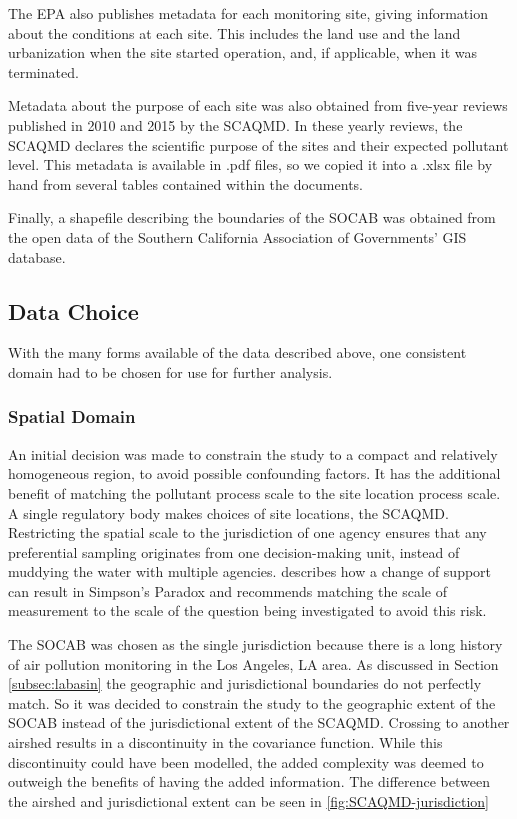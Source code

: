 The \ac{EPA} also publishes metadata for each monitoring site, giving information about the conditions at each site.  This includes the land use and the land urbanization when the site started operation, and, if applicable, when it was terminated.

Metadata about the purpose of each site was also obtained from five-year reviews published in 2010 and 2015 by the \ac{SCAQMD}. In these yearly reviews, the \ac{SCAQMD} declares the scientific purpose of the sites and their expected pollutant level. This metadata is available in .pdf files, so we copied it into a .xlsx file by hand from several tables contained within the documents.

Finally, a shapefile describing the boundaries of the \ac{SOCAB} was obtained from the open data of the Southern California Association of Governments' GIS database.




\subsection{Data Choice}\label{subsec:datachoice}
With the many forms available of the data described above, one consistent domain had to be chosen for use for further analysis. 

\subsubsection*{Spatial Domain} \label{subsubsec:SpatialDomain}
An initial decision was made to constrain the study to a compact and relatively homogeneous region, to avoid possible confounding factors. It has the additional benefit of matching the pollutant process scale to the site location process scale.  A single regulatory body makes choices of site locations, the \ac{SCAQMD}.  Restricting the spatial scale to the jurisdiction of one agency ensures that any 
preferential sampling originates from one decision-making unit, instead of muddying the water with multiple agencies.   \cite{cressie2011statistics} describes how a change of support can result in Simpson's Paradox and recommends matching the scale of measurement to the scale of the question being investigated to avoid this risk.

The \ac{SOCAB} was chosen as the single jurisdiction because there is a long history of air pollution monitoring in the Los Angeles, LA area.  As discussed in Section \ref{subsec:labasin} the geographic and jurisdictional boundaries do not perfectly match.  So it was decided to constrain the study to the geographic extent of the \ac{SOCAB} instead of the jurisdictional extent of the \ac{SCAQMD}.  Crossing to another airshed results in a discontinuity in the covariance function.  While this discontinuity could have been modelled, the added complexity was deemed to outweigh the benefits of having the added information. The difference between the airshed and jurisdictional extent can be seen in \ref{fig:SCAQMD-jurisdiction}

